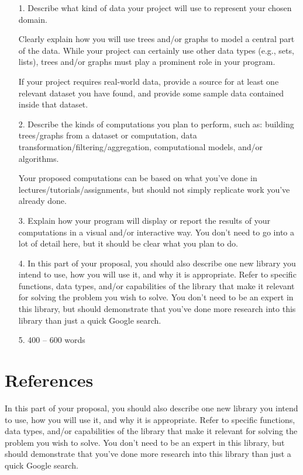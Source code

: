 \documentclass[fontsize=11pt]{article}
\begin{document}
\begin{enumerate}
    \item[1.]
    Describe what kind of data your project will use to represent your chosen domain.
    
    Clearly explain how you will use trees and/or graphs to model a central part of the data. While your project can certainly use other data types (e.g., sets, lists), trees and/or graphs must play a prominent role in your program.
    
    If your project requires real-world data, provide a source for at least one relevant dataset you have found, and provide some sample data contained inside that dataset.

    \item[2.]
    Describe the kinds of computations you plan to perform, such as: building trees/graphs from a dataset or computation, data transformation/filtering/aggregation, computational models, and/or algorithms.
   
    Your proposed computations can be based on what you’ve done in lectures/tutorials/assignments, but should not simply replicate work you’ve already done.
    
    \item[3.]
    Explain how your program will display or report the results of your computations in a visual and/or interactive way. You don’t need to go into a lot of detail here, but it should be clear what you plan to do.
    
    \item[4.]
    In this part of your proposal, you should also describe one new library you intend to use, how you will use it, and why it is appropriate. Refer to specific functions, data types, and/or capabilities of the library that make it relevant for solving the problem you wish to solve. You don’t need to be an expert in this library, but should demonstrate that you’ve done more research into this library than just a quick Google search.

    \item[5.] 
    400 – 600 words
\end{enumerate}



\section*{References}

In this part of your proposal, you should also describe one new library you intend to use, how you will use it, and why it is appropriate. Refer to specific functions, data types, and/or capabilities of the library that make it relevant for solving the problem you wish to solve. You don’t need to be an expert in this library, but should demonstrate that you’ve done more research into this library than just a quick Google search.

\end{document}
